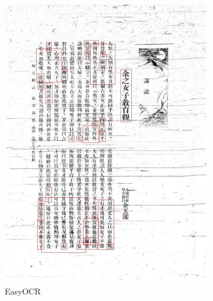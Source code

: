 \documentclass{beamer}
\begin{document}
\begin{frame}
\begin{figure}[htbp]
\begin{subfigure}[b]{0.23\linewidth}
            \includegraphics[width=\linewidth]{./figures/samples/easy_01.jpg}
            \caption{EasyOCR}
            \label{fig:easy_01}
        \end{subfigure}
        \hfill
        \begin{subfigure}[b]{0.23\linewidth}

\end{subfigure}
\end{figure}
\end{frame}
\end{document}
